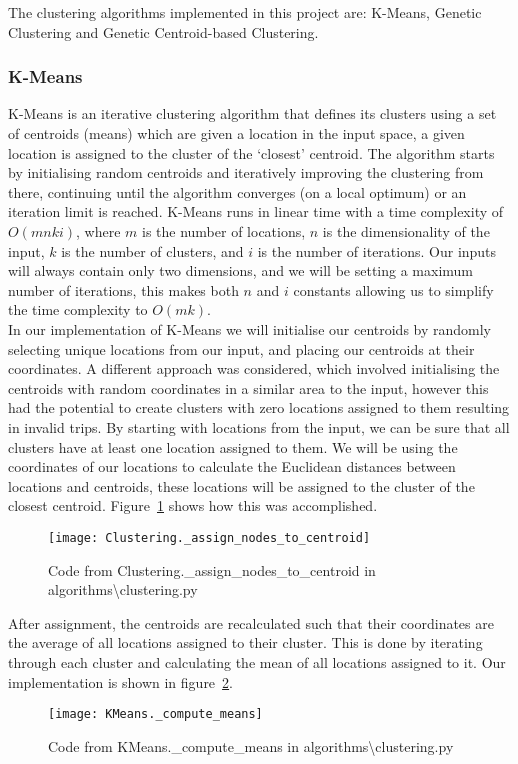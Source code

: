 \noindent
The clustering algorithms implemented in this project are: K-Means, Genetic Clustering and Genetic Centroid-based
Clustering.

\subsubsection{K-Means}\label{subsubsec:k-means}
K-Means is an iterative clustering algorithm that defines its clusters using a set of centroids (means) which are
given a location in the input space, a given location is assigned to the cluster of the `closest' centroid.
The algorithm starts by initialising random centroids and iteratively improving the clustering from there, continuing
until the algorithm converges (on a local optimum) or an iteration limit is reached.
K-Means runs in linear time with a time complexity of $O(m n k i)$, where $m$ is the number of locations, $n$ is the
dimensionality of the input, $k$ is the number of clusters, and $i$ is the number of iterations\parencite[p. 102]{hartigan1979algorithm}.
Our inputs will always contain only two dimensions, and we will be setting a maximum number of iterations, this
makes both $n$ and $i$ constants allowing us to simplify the time complexity to $O(m k)$.\\

\noindent
In our implementation of K-Means we will initialise our centroids by randomly selecting unique locations from our
input, and placing our centroids at their coordinates.
A different approach was considered, which involved initialising the centroids with random coordinates in a similar
area to the input, however this had the potential to create clusters with zero locations assigned to them resulting
in invalid trips.
By starting with locations from the input, we can be sure that all clusters have at least one location assigned to them.
We will be using the coordinates of our locations to calculate the Euclidean distances between locations and centroids,
these locations will be assigned to the cluster of the closest centroid.
Figure~\ref{fig:Clustering._assign_nodes_to_centroid} shows how this was accomplished.
\begin{figure}[H]
    \centering
    \texttt{[image: Clustering.\_assign\_nodes\_to\_centroid]}
    \caption{Code from Clustering.\_assign\_nodes\_to\_centroid in algorithms\textbackslash clustering.py}
    \label{fig:Clustering._assign_nodes_to_centroid}
\end{figure}

\noindent
After assignment, the centroids are recalculated such that their coordinates are the average of all locations
assigned to their cluster.
This is done by iterating through each cluster and calculating the mean of all locations assigned to it.
Our implementation is shown in figure~\ref{fig:KMeans._compute_means}.
\begin{figure}[H]
    \centering
    \texttt{[image: KMeans.\_compute\_means]}
    \caption{Code from KMeans.\_compute\_means in algorithms\textbackslash clustering.py}
    \label{fig:KMeans._compute_means}
\end{figure}

